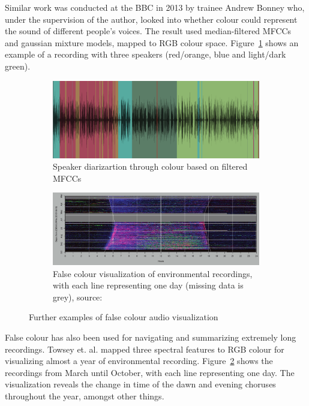 Similar work was conducted at the BBC in 2013 by trainee Andrew Bonney who,
under the supervision of the author, looked into whether colour could represent
the sound of different people's voices. The result used median-filtered MFCCs
and gaussian mixture models, mapped to RGB colour space.
Figure~\ref{fig:bonney} shows an example of a recording with three speakers
(red/orange, blue and light/dark green).

\begin{figure}[ht]
\centering
\begin{subfigure}{.5\textwidth}
  \centering
  \includegraphics[width=0.95\linewidth]{figs/bonney.png}
  \caption{Speaker diarizartion through colour based on filtered MFCCs}
  \label{fig:bonney}
\end{subfigure}%
\begin{subfigure}{.5\textwidth}
  \centering
  \includegraphics[width=0.95\linewidth]{figs/towsey.png}
  \caption{False colour visualization of environmental recordings, with each
    line representing one day (missing data is grey), source:
    \cite{Towsey2014}}
  \label{fig:towsey}
\end{subfigure}
  \caption{Further examples of false colour audio visualization}
\label{fig:falsecolour}
\end{figure}

False colour has also been used for navigating and summarizing extremely long
recordings. Towsey et. al. \cite{Towsey2014} mapped three spectral features to
RGB colour for visualizing almost a year of environmental recording.
Figure~\ref{fig:towsey} shows the recordings from March until October, with
each line representing one day. The visualization reveals the change in time of
the dawn and evening choruses throughout the year, amongst other things.

